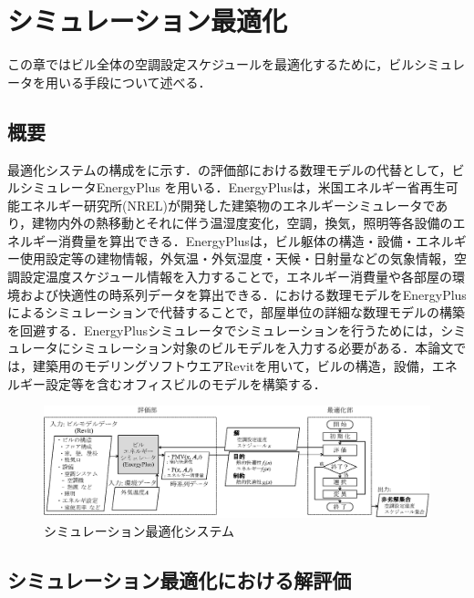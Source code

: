 \chapter{シミュレーション最適化 }
\label{chap::sim}

\hspace{1zw}この章ではビル全体の空調設定スケジュールを最適化するために，ビルシミュレータを用いる手段について述べる．

\section{概要}
最適化システムの構成をに示す．の評価部における数理モデルの代替として，ビルシミュレータEnergyPlus \cite{NREL19}を用いる．EnergyPlusは，米国エネルギー省再生可能エネルギー研究所(NREL)が開発した建築物のエネルギーシミュレータであり，建物内外の熱移動とそれに伴う温湿度変化，空調，換気，照明等各設備のエネルギー消費量を算出できる．EnergyPlusは，ビル躯体の構造・設備・エネルギー使用設定等の建物情報，外気温・外気湿度・天候・日射量などの気象情報，空調設定温度スケジュール情報を入力することで，エネルギー消費量や各部屋の環境および快適性の時系列データを算出できる．における数理モデルをEnergyPlusによるシミュレーションで代替することで，部屋単位の詳細な数理モデルの構築を回避する．EnergyPlusシミュレータでシミュレーションを行うためには，シミュレータにシミュレーション対象のビルモデルを入力する必要がある．本論文では，建築用のモデリングソフトウエアRevitを用いて，ビルの構造，設備，エネルギー設定等を含むオフィスビルのモデルを構築する．

\begin{figure}[t]
  \begin{center}
    \includegraphics[width=1.1\linewidth]{fig/sim_system.eps}
  \end{center}
  \caption{シミュレーション最適化システム}
  \label{fig::sim_system}
\end{figure}


\section{シミュレーション最適化における解評価}\label{sec::sim_model}
